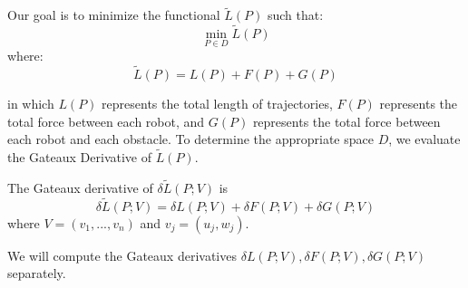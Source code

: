 Our goal is to minimize the functional \( \tilde{L}(P)\) such that:
\[  \min_{P\in D} \tilde{L}(P)                    \]
where:
\[ \tilde{L}(P) = L(P) + F(P) + G(P)\]

in which \(L(P) \) represents the total length of trajectories, \( F(P) \) represents the total force between each robot, and \( G(P) \) represents the total force between each robot and each obstacle.  To determine the appropriate space \( D \), we evaluate the Gateaux Derivative of \( \tilde{L}(P) \).

The Gateaux derivative of \( \delta \tilde{L}(P;V)\) is
\[ \delta \tilde{L}(P;V) = \delta L(P;V) + \delta F(P;V) + \delta G(P;V)\]
where \( V = (v_1,...,v_n) \) and \( v_j = (u_j,w_j) \).

We will compute the Gateaux derivatives \(\delta L(P;V) , \delta F(P;V) , \delta G(P;V)\) separately.

